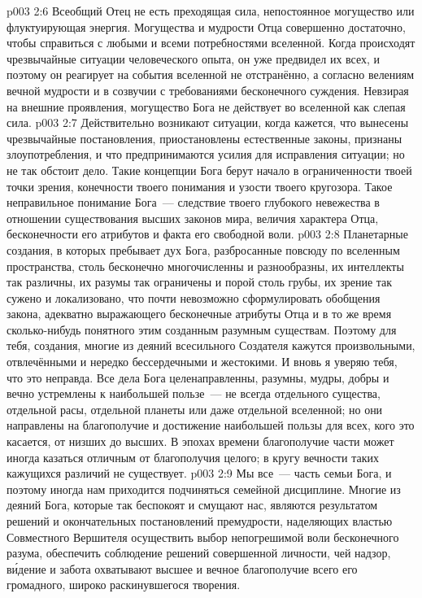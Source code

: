 \vs p003 2:6 \pc Всеобщий Отец не есть преходящая сила, непостоянное могущество или флуктуирующая энергия. Могущества и мудрости Отца совершенно достаточно, чтобы справиться с любыми и всеми потребностями вселенной. Когда происходят чрезвычайные ситуации человеческого опыта, он уже предвидел их всех, и поэтому он реагирует на события вселенной не отстранённо, а согласно велениям вечной мудрости и в созвучии с требованиями бесконечного суждения. Невзирая на внешние проявления, могущество Бога не действует во вселенной как слепая сила.
\vs p003 2:7 Действительно возникают ситуации, когда кажется, что вынесены чрезвычайные постановления, приостановлены естественные законы, признаны злоупотребления, и что предпринимаются усилия для исправления ситуации; но не так обстоит дело. Такие концепции Бога берут начало в ограниченности твоей точки зрения, конечности твоего понимания и узости твоего кругозора. Такое неправильное понимание Бога~--- следствие твоего глубокого невежества в отношении существования высших законов мира, величия характера Отца, бесконечности его атрибутов и факта его свободной воли.
\vs p003 2:8 Планетарные создания, в которых пребывает дух Бога, разбросанные повсюду по вселенным пространства, столь бесконечно многочисленны и разнообразны, их интеллекты так различны, их разумы так ограничены и порой столь грубы, их зрение так сужено и локализовано, что почти невозможно сформулировать обобщения закона, адекватно выражающего бесконечные атрибуты Отца и в то же время сколько\hyp{}нибудь понятного этим созданным разумным существам. Поэтому для тебя, создания, многие из деяний всесильного Создателя кажутся произвольными, отвлечёнными и нередко бессердечными и жестокими. И вновь я уверяю тебя, что это неправда. Все дела Бога целенаправленны, разумны, мудры, добры и вечно устремлены к наибольшей пользе~--- не всегда отдельного существа, отдельной расы, отдельной планеты или даже отдельной вселенной; но они направлены на благополучие и достижение наибольшей пользы для всех, кого это касается, от низших до высших. В эпохах времени благополучие части может иногда казаться отличным от благополучия целого; в кругу вечности таких кажущихся различий не существует.
\vs p003 2:9 Мы все~--- часть семьи Бога, и поэтому иногда нам приходится подчиняться семейной дисциплине. Многие из деяний Бога, которые так беспокоят и смущают нас, являются результатом решений и окончательных постановлений премудрости, наделяющих властью Совместного Вершителя осуществить выбор непогрешимой воли бесконечного разума, обеспечить соблюдение решений совершенной личности, чей надзор, в\'идение и забота охватывают высшее и вечное благополучие всего его громадного, широко раскинувшегося творения.
